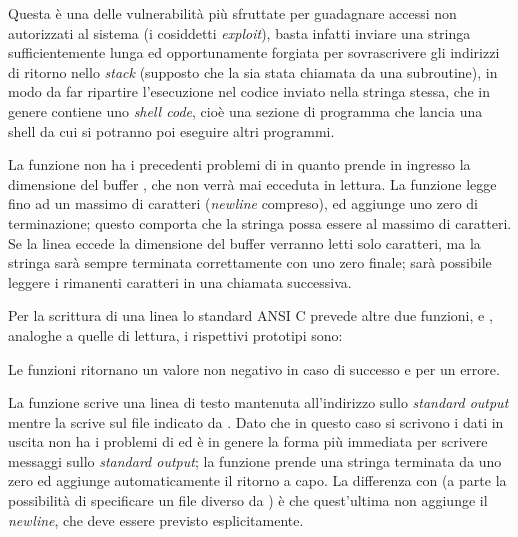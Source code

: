 Questa è una delle vulnerabilità più sfruttate per guadagnare accessi non
autorizzati al sistema (i cosiddetti \textit{exploit}), basta infatti inviare
una stringa sufficientemente lunga ed opportunamente forgiata per
sovrascrivere gli indirizzi di ritorno nello \textit{stack} (supposto che la
 sia stata chiamata da una subroutine), in modo da far ripartire
l'esecuzione nel codice inviato nella stringa stessa, che in genere contiene
uno \textit{shell code}, cioè una sezione di programma che lancia una shell da
cui si potranno poi eseguire altri programmi.


La funzione  non ha i precedenti problemi di  in quanto
prende in ingresso la dimensione del buffer , che non verrà mai
ecceduta in lettura. La funzione legge fino ad un massimo di 
caratteri (\textit{newline} compreso), ed aggiunge uno zero di terminazione;
questo comporta che la stringa possa essere al massimo di 
caratteri.  Se la linea eccede la dimensione del buffer verranno letti solo
 caratteri, ma la stringa sarà sempre terminata correttamente con
uno zero finale; sarà possibile leggere i rimanenti caratteri in una chiamata
successiva.

Per la scrittura di una linea lo standard ANSI C prevede altre due
funzioni,  e , analoghe a quelle di lettura, i
rispettivi prototipi sono:

\begin{funcproto}{
}

{Le funzioni ritornano un valore non negativo in caso di successo e 
  per un errore.}
\end{funcproto}

La funzione  scrive una linea di testo mantenuta
all'indirizzo  sullo \textit{standard output} mentre 
la scrive sul file indicato da .  Dato che in questo caso si
scrivono i dati in uscita  non ha i problemi di  ed è in
genere la forma più immediata per scrivere messaggi sullo \textit{standard
  output}; la funzione prende una stringa terminata da uno zero ed aggiunge
automaticamente il ritorno a capo. La differenza con  (a parte la
possibilità di specificare un file diverso da ) è che quest'ultima
non aggiunge il \textit{newline}, che deve essere previsto esplicitamente.

